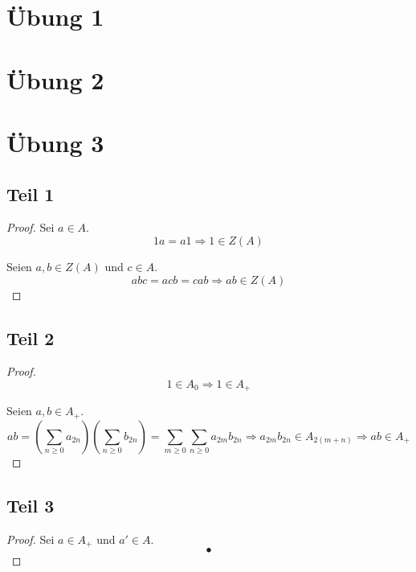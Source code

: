 \documentclass[10pt,a4paper]{article}
\begin{document}
\section*{Übung 1}

\section*{Übung 2}

\section*{Übung 3}

\subsection*{Teil 1}

\begin{proof}
Sei $a \in A$.
\begin{equation}
1a = a1 \Rightarrow 1 \in Z(A)
\end{equation}

Seien $a, b \in Z(A)$ und $c \in A$.
\begin{equation}
abc = acb = cab \Rightarrow ab \in Z(A)
\end{equation}
\end{proof}

\subsection*{Teil 2}

\begin{proof}
\begin{equation}
1 \in A_{0} \Rightarrow 1 \in A_{+}
\end{equation}

Seien $a, b \in A_{+}$.
\begin{equation}
ab = \left( \sum_{n \ge 0} a_{2n} \right)\left( \sum_{n \ge 0} b_{2n} \right) = \sum_{m \ge 0} \sum_{n \ge 0} a_{2m}b_{2n} \Rightarrow a_{2m}b_{2n} \in A_{2(m + n)} \Rightarrow ab \in A_{+}
\end{equation}
\end{proof}

\subsection*{Teil 3}

\begin{proof}
Sei $a \in A_{+}$ und $a' \in A$.
\begin{equation}
•
\end{equation}
\end{proof}
\end{document}
